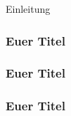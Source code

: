 \begin{frame}
	\begin{center}
		\Huge Einleitung
	\end{center}
\end{frame}

\begin{frame}
	\frametitle{Euer Titel}
\end{frame}

\begin{frame}
	\frametitle{Euer Titel}
\end{frame}

\begin{frame}
	\frametitle{Euer Titel}
\end{frame}